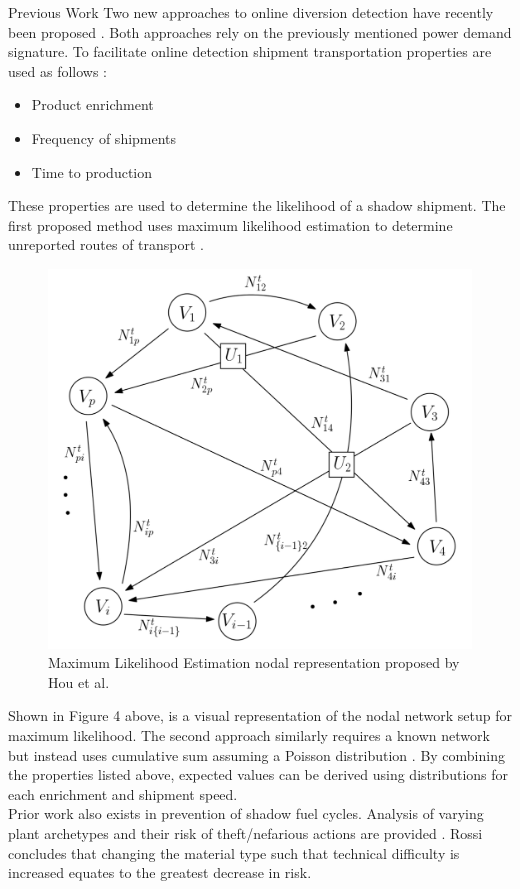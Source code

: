 \documentclass[final]{beamer}
\newlength{\onecolwid}
\newlength{\threecolwid}
\begin{document}
\begin{frame}[t]
\begin{columns}[t,totalwidth=\threecolwid]
\begin{column}{\onecolwid}
\begin{block}{Previous Work}
Two new approaches to online diversion detection have recently been proposed \cite{Hou_2016,Yilmaz_2016}. Both
approaches rely on the previously mentioned power demand signature. To facilitate online detection shipment transportation
properties are used as follows \cite{Yilmaz_2016}:

\begin{itemize}
		\item Product enrichment
		\item Frequency of shipments
		\item Time to production
	\end{itemize}
These properties are used to determine the likelihood of a shadow shipment. The first proposed method uses maximum likelihood
estimation to determine unreported routes of transport \cite{Hou_2016}. 
\begin{figure}
	\includegraphics{Hou_Network.png}
	\caption{Maximum Likelihood Estimation nodal representation proposed by Hou et al\cite{Hou_2016}.}
\end{figure}
Shown in Figure 4 above, is a visual representation of the nodal network setup for maximum likelihood. The second approach
similarly requires a known network but instead uses cumulative sum assuming a Poisson distribution \cite{Yilmaz_2016}.
By combining the properties listed above, expected values can be derived using distributions for each enrichment and
shipment speed. \\
\vspace{10mm}
Prior work also exists in prevention of shadow fuel cycles. Analysis of varying plant archetypes and their risk of theft/nefarious
actions are provided \cite{Rossi_2016}. Rossi concludes that changing the material type such that technical difficulty is increased
equates to the greatest decrease in risk.
\end{block}


\end{column}
\end{columns}
\end{frame}
\end{document}
